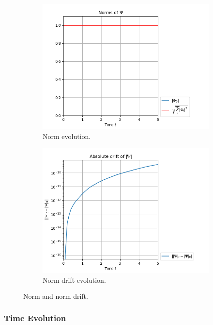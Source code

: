 \documentclass[11pt, a4paper, oneside]{article}
\begin{document}
\begin{figure}[h]
  \begin{subfigure}[b]{0.45 \textwidth}
    \includegraphics[width = \textwidth]{graphics/torsional/norms_block0.PNG}
    \caption{Norm evolution.}
  \end{subfigure}
  \hfill
  \begin{subfigure}[b]{0.45 \textwidth}
    \includegraphics[width = \textwidth]{graphics/torsional/norms_drift_block0_log.PNG}
    \caption{Norm drift evolution.}
  \end{subfigure}
  \caption{Norm and norm drift.}
  \label{fig:cos_norm}
\end{figure}

\subsubsection{Time Evolution}
\end{document}
